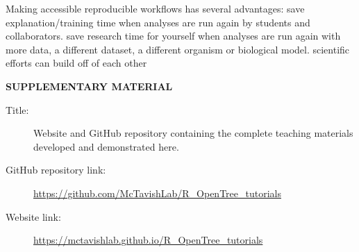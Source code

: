 \documentclass[12pt]{article}
\begin{document}
Making accessible reproducible workflows has several advantages:
save explanation/training time when analyses are run again by students and collaborators.
save research time for yourself when analyses are run again with more data, a different dataset, a different organism or biological model.
scientific efforts can build off of each other

\bigskip
\begin{center}
{\large\bf SUPPLEMENTARY MATERIAL}
\end{center}

\begin{description}

\item[Title:] Website and GitHub repository containing the complete teaching materials developed and demonstrated here.

\item[GitHub repository link:] \url{https://github.com/McTavishLab/R_OpenTree_tutorials}

\item[Website link:] \url{https://mctavishlab.github.io/R_OpenTree_tutorials}

\end{description}


\end{document}
